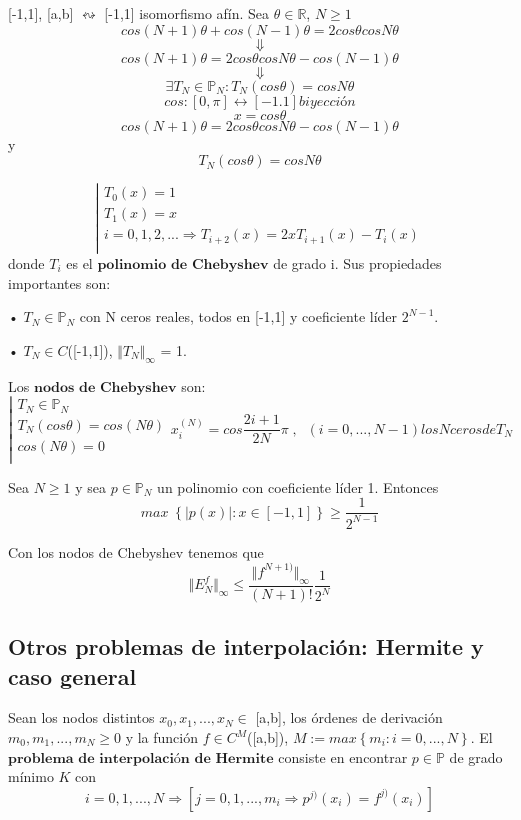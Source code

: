 [-1,1], [a,b] $\leftrightsquigarrow$ [-1,1] isomorfismo afín. Sea $\theta \in \mathbb{R}$, $N \geq 1$
\[ cos(N+1) \theta + cos(N-1) \theta = 2cos \theta cos N\theta \]
\[\Downarrow \]
\[ cos(N+1) \theta = 2cos \theta cos N\theta - cos(N-1) \theta \]
\[ \Downarrow \]
\[ \exists T_N \in \mathbb{P}_N : T_N (cos \theta ) = cos N\theta \]
\[ cos : \left[ 0,\pi \right] \longleftrightarrow \left[ -1.1 \right] biyección \]
\[ x = cos \theta \]
\[ cos (N+1) \theta = 2 cos \theta cos N\theta - cos(N-1) \theta \]
y
\[ T_N(cos \theta ) = cos N\theta \]

\[
\left| 
\begin{array}{c}
T_0(x)=1 \\
T_1(x)=x \\
i=0,1,2,... \Rightarrow T_{i+2}(x)=2xT_{i+1}(x)-T_i(x) \\
\end{array}
\right.
\]
donde $T_i$ es el $\textbf{polinomio de Chebyshev}$ de grado i. Sus propiedades importantes son:

\begin{nlist}
\item[•] $T_N \in \mathbb{P}_N$ con N ceros reales, todos en [-1,1] y coeficiente líder $2^{N-1}$.
\item[•] $T_N \in C$([-1,1]), $\Vert T_N \Vert _\infty$ = 1.
\end{nlist}

Los $\textbf{nodos de Chebyshev}$ son:
\[
\left| 
\begin{array}{c}
T_N \in \mathbb{P}_N \\
T_N(cos \theta ) = cos(N \theta ) \\
cos(N\theta ) = 0 \\
\end{array}
\right.
x_i^{(N)} = cos \frac{2i+1}{2N}\pi \; , \; \; (i=0,...,N-1) los N ceros de T_N
\]

\begin{nth}
Sea $N \geq 1$ y sea $p \in \mathbb{P} _N$ un polinomio con coeficiente líder 1. Entonces
\[ max \; \left\lbrace \vert p(x) \vert : x \in \left[ -1,1 \right] \right\rbrace \geq \frac{1}{2^{N-1}} \]
\end{nth}

Con los nodos de Chebyshev tenemos que
\[ \Vert E_N^f \Vert _\infty \leq \frac{\Vert f^{N+1)} \Vert _\infty}{(N+1)!} \frac{1}{2^N} \]

\subsection{Otros problemas de interpolación: Hermite y caso general}
Sean los nodos distintos $x_0,x_1,...,x_N \in$ [a,b], los órdenes de derivación $m_0,m_1,...,m_N \geq 0$ y la función $f \in C^M$([a,b]), $M:= max \left\lbrace m_i : i=0,...,N \right\rbrace$. El $\textbf{problema de interpolación de Hermite}$ consiste en encontrar $p \in \mathbb{P}$ de grado mínimo $K$ con
\[ i=0,1,...,N \Rightarrow \left[ j=0,1,...,m_i \Rightarrow p^{j)}(x_i) = f^{j)}(x_i) \right] \]

